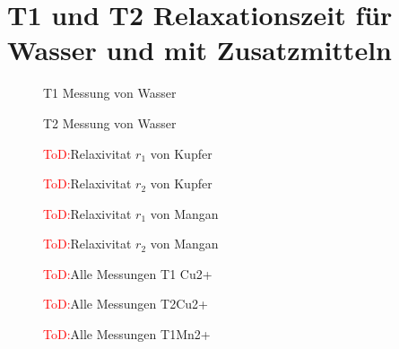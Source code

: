 \section{T1 und T2 Relaxationszeit für Wasser und mit Zusatzmitteln}
 

\begin{figure}[H]
    \centering
    
    \caption{T1 Messung von Wasser}
\end{figure}

\begin{figure}[H]
    \centering
    
    \caption{T2 Messung von Wasser}
\end{figure}

\begin{figure}[H]
    \centering
    
    \caption{\textcolor{red}{ToD:}Relaxivitat $r_1$ von Kupfer}
    \label{fig:RelaxCUT1}
\end{figure}

\begin{figure}[H]
    \centering
    
    \caption{\textcolor{red}{ToD:}Relaxivitat $r_2$ von Kupfer}
    \label{fig:RelaxCUT2}
\end{figure}

\begin{figure}[H]
    \centering
    
    \caption{\textcolor{red}{ToD:}Relaxivitat $r_1$ von Mangan}
    \label{fig:RelaxMNT1}
\end{figure}

\begin{figure}[H]
    \centering
    
    \caption{\textcolor{red}{ToD:}Relaxivitat $r_2$ von Mangan}
    \label{fig:RelaxMNT2}
\end{figure}

\begin{figure}[H]
    \centering
    
    \caption{\textcolor{red}{ToD:}Alle Messungen T1 Cu2+}
    \label{fig:T1CU}
\end{figure}

\begin{figure}[H]
    \centering
    
    \caption{\textcolor{red}{ToD:}Alle Messungen T2Cu2+}
    \label{fig:T2CU}
\end{figure}

\begin{figure}[H]
    \centering
    
    \caption{\textcolor{red}{ToD:}Alle Messungen T1Mn2+}
    \label{fig:T1Mn}
\end{figure}

